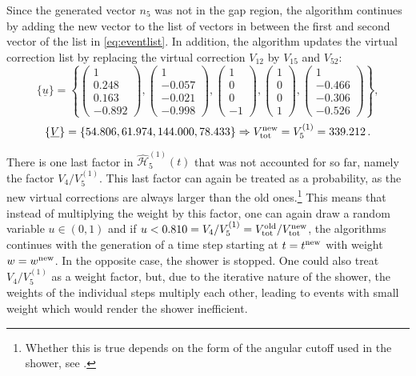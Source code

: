 \documentclass[11pt,a4paper]{article}
\begin{document}
Since the generated vector $n_5$ was not in the gap region, the algorithm continues by adding the new vector to the list of vectors in between the first and second vector of the list in \eqref{eq:eventlist}.
In addition, the algorithm updates the virtual correction list by replacing the virtual correction $V_{12}$ by $V_{15}$ and $V_{52}$:
\begin{equation}
\{\underline{u}\}=\left\{\left(\begin{matrix} 1\\0.248\\ 0.163\\-0.892\end{matrix}\right),\left(\begin{matrix} 1\\-0.057\\-0.021\\ -0.998\end{matrix}\right), \left(\begin{matrix} 1\\0\\ 0\\-1\end{matrix}\right),\left(\begin{matrix} 1\\0\\ 0\\1\end{matrix}\right),\left(\begin{matrix} 1\\-0.466\\ -0.306\\ -0.526\end{matrix}\right)\right\} ,
\end{equation}
\begin{equation}
\{\underline{V}\}=\left\{54.806,61.974,144.000,78.433\right\} \Rightarrow V_{{\rm tot}}^{\rm new}= V_5^{(1)}=339.212\, .
\end{equation}


There is one last factor in $\mathcal{\hat{H}}^{(1)}_5(t)$ that was not accounted for so far, namely the factor $V_{4}/V_5^{(1)}$.  This last factor can again be treated as a probability, as the new virtual corrections are always larger than the old ones.\footnote{Whether this is true depends on the form of the angular cutoff used in the shower, see \cite{Balsiger:2018ezi}.}  This means that instead of multiplying the weight by this factor, one can again draw a random variable $u\in(0,1)$ and if $u<0.810=V_{4}/V_5^{(1)}= V_{{\rm tot}}^{{\rm old}}/V_{{\rm tot}}^{{\rm new}} $, the algorithms continues with the generation of a time step starting at $t=t^{{\rm new}}$ with weight $w=w^{{\rm new}}$. In the opposite case, the shower is stopped. One could also treat $V_{4}/V_5^{(1)}$ as a weight factor, but, due to the iterative nature of the shower, the weights of the individual steps multiply each other, leading to events with small weight which would render the shower inefficient.
\end{document}
